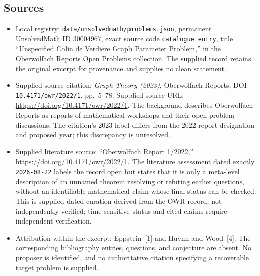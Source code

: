 \documentclass[11pt]{article}
\begin{document}
\subsection{Sources}
\begin{itemize}
\item Local registry: \texttt{data/unsolvedmath/problems.json}, permanent UnsolvedMath ID \(30004967\), exact source code \texttt{catalogue entry}, title ``Unspecified Colin de Verdiere Graph Parameter Problem,'' in the Oberwolfach Reports Open Problems collection. The supplied record retains the original excerpt for provenance and supplies no clean statement.
\item Supplied source citation: \emph{Graph Theory (2023)}, Oberwolfach Reports, DOI \texttt{10.4171/owr/2022/1}, pp.~5--78. Supplied source URL: \url{https://doi.org/10.4171/owr/2022/1}. The background describes Oberwolfach Reports as reports of mathematical workshops and their open-problem discussions. The citation's 2023 label differs from the 2022 report designation and proposed year; this discrepancy is unresolved.
\item Supplied literature source: ``Oberwolfach Report 1/2022,'' \url{https://doi.org/10.4171/owr/2022/1}. The literature assessment dated exactly \texttt{2026-08-22} labels the record open but states that it is only a meta-level description of an unnamed theorem resolving or refuting earlier questions, without an identifiable mathematical claim whose final status can be checked. This is supplied dated curation derived from the OWR record, not independently verified; time-sensitive status and cited claims require independent verification.
\item Attribution within the excerpt: Eppstein~[1] and Huynh and Wood~[4]. The corresponding bibliography entries, questions, and conjecture are absent. No proposer is identified, and no authoritative citation specifying a recoverable target problem is supplied.
\end{itemize}
\end{document}
